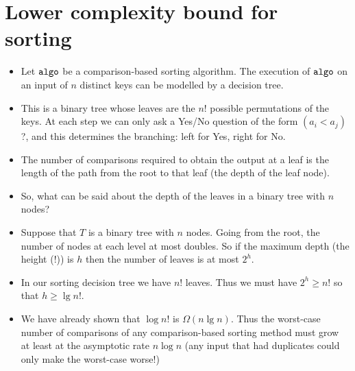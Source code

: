 \chapter{Lower complexity bound for sorting} %
\label{sec:lowerbound}

\begin{itemize}
\item Let $\operatorname{\text{\texttt{algo}}}$ be a comparison-based sorting algorithm. The execution
of $\operatorname{\text{\texttt{algo}}}$ on an input of $n$ distinct keys can be modelled by a
{decision tree}. 
\item This is a binary tree whose leaves are the
$n!$ possible permutations of the keys. At each step we can only ask a Yes/No 
question of the form $(a_i < a_j)$?, and this determines the branching: left for
 Yes, right for No.
\item The number of comparisons required to obtain the output at a leaf is the 
length of the path from the root to that leaf (the {depth} of the leaf 
node).
\item So, what can be said about the depth of the leaves in a binary tree with 
$n$ nodes?
\end{itemize}





\begin{itemize}
\item Suppose that $T$ is a binary tree with $n$ nodes. Going from the root, the
 number of nodes at each level at most doubles. So if the maximum depth (the 
 {height} (!)) is $h$ then the number of leaves is at most $2^h$.
\item In our sorting decision tree we have $n!$ leaves. Thus we must have $2^h 
\geq n!$ so that $h \geq \lg n!$. 
\item We have already shown that $\log n!$ is $\Omega (n \lg n)$. Thus the 
worst-case number of comparisons of any comparison-based sorting method must 
grow at least at the asymptotic rate $n \log n$ (any input that had duplicates 
could only make the worst-case worse!)
\end{itemize}

